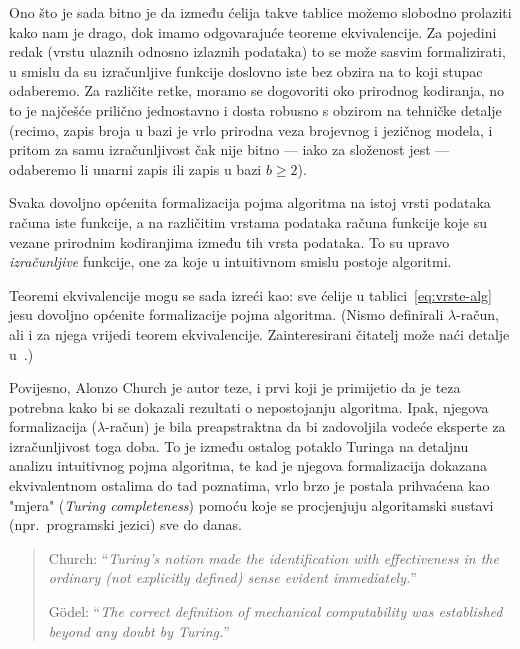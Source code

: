 Ono što je sada bitno je da između ćelija takve tablice možemo slobodno prolaziti kako nam je drago, dok imamo odgovarajuće teoreme ekvivalencije. Za pojedini redak (vrstu ulaznih odnosno izlaznih podataka) to se može sasvim formalizirati, u smislu da su izračunljive funkcije doslovno iste bez obzira na to koji stupac odaberemo. Za različite retke, moramo se dogovoriti oko prirodnog kodiranja, no to je najčešće prilično jednostavno i dosta robusno s obzirom na tehničke detalje (recimo, zapis broja u bazi je vrlo prirodna veza brojevnog i jezičnog modela, i pritom za samu izračunljivost čak nije bitno --- iako za složenost jest --- odaberemo li unarni zapis ili zapis u bazi $b\ge2$).

\begin{ctteza}
Svaka dovoljno općenita formalizacija pojma algoritma na istoj vrsti podataka ra\-ču\-na iste funkcije, a na različitim vrstama podataka računa funkcije koje su vezane prirodnim kodiranjima između tih vrsta podataka. To su upravo \emph{izračunljive} funkcije, one za koje u intuitivnom smislu postoje algoritmi.
\end{ctteza}

Teoremi ekvivalencije mogu se sada izreći kao: sve ćelije u tablici~\eqref{eq:vrste-alg} jesu dovoljno općenite formalizacije pojma algoritma. (Nismo definirali $\lambda$-račun, ali i za njega vrijedi teorem ekvivalencije. Zainteresirani čitatelj može naći detalje u~\cite{lovnicki}.)

Povijesno, Alonzo Church je autor teze, i prvi koji je primijetio da je teza potrebna kako bi se dokazali rezultati o nepostojanju algoritma. Ipak, njegova formalizacija ($\lambda$-račun) je bila preapstraktna da bi zadovoljila vodeće eksperte za izračunljivost toga doba. To je između ostalog potaklo Turinga na detaljnu analizu intuitivnog pojma algoritma, te kad je njegova formalizacija dokazana ekvivalentnom ostalima do tad poznatima, vrlo brzo je postala prihvaćena kao "mjera" (\emph{Turing completeness}) pomoću koje se procjenjuju algoritamski sustavi (npr.\ programski jezici) sve do danas.

\begin{quote}
    Church: ``{\emph{Turing's notion made the identification with effectiveness in the ordinary (not explicitly defined) sense evident immediately.}}''
    
    G\"odel: ``{\emph{The correct definition of mechanical computability was established beyond any doubt by Turing.}}''
\end{quote}

